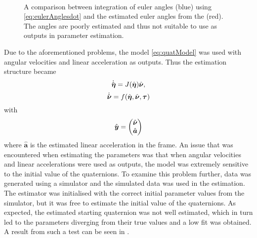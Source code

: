 \begin{figure}[htbp]
  \centering
  \qquad
  \\
  \caption{\label{fig:integratedAngleVelocities}%
  A comparison between integration of euler angles (blue) using \eqref{eq:eulerAnglesdot} and the estimated euler angles from the \abbrEKF (red). The angles are poorly estimated and thus not suitable to use as outputs in parameter estimation.}
\end{figure}
Due to the aforementioned problems, the model \eqref{eq:quatModel} was used with angular velocities and linear acceleration as outputs. Thus the estimation structure became
\begin{equation}
\dot{\hat{\boldsymbol{\eta}}} = J(\hat{\boldsymbol{\eta}}) \hat{\boldsymbol{\nu}},
\end{equation}
\begin{equation}
\dot{\hat{\boldsymbol{\nu}}} =  f(\hat{\boldsymbol{\eta}}, \hat{\boldsymbol{\nu}}, \boldsymbol{\tau})
\end{equation}
with 
\begin{equation}
\hat{\boldsymbol{y}} = \begin{pmatrix}
\hat{\boldsymbol{\nu}} \\
\hat{\boldsymbol{a}}
\end{pmatrix}
\end{equation}
where $\hat{\boldsymbol{a}}$ is the estimated linear acceleration in the \abbrROV frame.
An issue that was encountered when estimating the parameters was that when angular velocities and linear accelerations were used as outputs, the model was extremely sensitive to the initial value of the quaternions. To examine this problem further, data was generated using a simulator and the simulated data was used in the estimation. The estimator was initialised with the correct initial parameter values from the simulator, but it was free to estimate the initial value of the quaternions. As expected, the estimated starting quaternion was not well estimated, which in turn led to the parameters diverging from their true values and a low fit was obtained. A result from such a test can be seen in .

